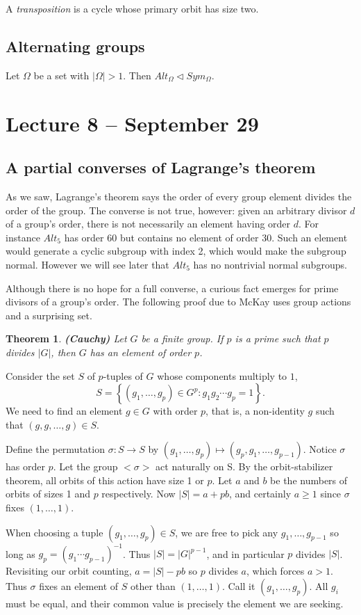 \documentclass[letterpaper]{article}
\newtheorem{theorem}{Theorem}[section]
\newenvironment{proof}[1][Proof]{\begin{trivlist}
\item[\hskip \labelsep {\bfseries #1}]}{\end{trivlist}}
\begin{document}
A \emph{transposition} is a cycle whose primary orbit has size two.

\subsection{Alternating groups}

Let $\Omega$ be a set with $|\Omega|>1$. Then $Alt_\Omega \lhd Sym_\Omega$.

\section{Lecture 8 -- September 29}

\subsection{A partial converses of Lagrange's theorem}

As we saw, Lagrange's theorem says the order of every group element divides the order of the group. The converse is not true, however: given an arbitrary divisor $d$ of a group's order, there is not necessarily an element having order $d$. For instance $Alt_5$ has order 60 but contains no element of order 30. Such an element would generate a cyclic subgroup with index 2, which would make the subgroup normal. However we will see later that $Alt_5$ has no nontrivial normal subgroups.

Although there is no hope for a full converse, a curious fact emerges for prime divisors of a group's order. The following proof due to McKay uses group actions and a surprising set.

\begin{theorem}
\emph{\textbf{(Cauchy)}}
Let $G$ be a finite group. If $p$ is a prime such that $p$ divides $|G|$, then $G$ has an element of order $p$.
\end{theorem}
\begin{proof}
Consider the set $S$ of $p$-tuples of $G$ whose components multiply to $1$,
\[S = \left\{ (g_1, \dots, g_p) \in G^p\colon g_1 g_2\cdots g_p = 1 \right\}.\]
We need to find an element $g \in G$ with order $p$, that is, a non-identity $g$ such that $(g, g, \ldots, g) \in S$.

Define the permutation $\sigma\colon S \rightarrow S$ by $(g_1, \dots, g_p) \mapsto (g_p, g_1, \dots, g_{p-1})$. Notice $\sigma$ has order $p$. Let the group ${<}\sigma{>}$ act naturally on S. By the orbit-stabilizer theorem, all orbits of this action have size 1 or $p$. Let $a$ and $b$ be the numbers of orbits of sizes 1 and $p$  respectively. Now $|S| = a + pb$, and certainly $a \geq 1$ since $\sigma$ fixes $(1, \ldots, 1)$.

When choosing a tuple $(g_1, \ldots, g_p) \in S$, we are free to pick any $g_1, \ldots, g_{p-1}$ so long as $g_p = (g_1 \cdots g_{p-1})^{-1}$. Thus $|S| = |G|^{p-1}$, and in particular $p$ divides $|S|$. Revisiting our orbit counting, $a = |S| - pb$ so $p$ divides $a$, which forces $a > 1$. Thus $\sigma$  fixes an element of $S$ other than $(1, \ldots, 1)$. Call it $(g_1, \ldots, g_p)$. All $g_i$ must be equal, and their common value is precisely the element we are seeking.
\end{proof}
\end{document}
